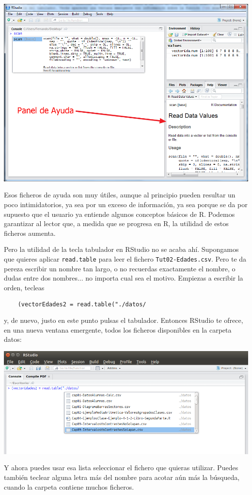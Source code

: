 \documentclass[10pt,a4paper]{article}\usepackage[]{graphicx}\usepackage[]{color}
\newcounter {cont01}
\begin{document}
    \begin{center}
    \includegraphics[width=14cm]{../fig/Tut02-09.png}
    \end{center}
Esos ficheros de ayuda son muy útiles, aunque al principio pueden resultar un poco intimidatorios, ya sea por un exceso de información, ya sea porque se da por supuesto que el usuario ya entiende algunos conceptos básicos de R. Podemos garantizar al lector que, a medida que se progresa en R, la utilidad de estos ficheros aumenta.

Pero la utilidad de la tecla tabulador en RStudio no se acaba ahí. Supongamos que quieres aplicar {\tt read.table} para leer el fichero {\tt Tut02-Edades.csv}. Pero te da pereza escribir un nombre tan largo, o no recuerdas exactamente el nombre, o dudas entre dos nombres... no importa cual sea el motivo. Empiezas a escribir la orden, tecleas 
    \begin{center}
    \begin{minipage}{10cm}
    \verb#    (vectorEdades2 = read.table("./datos/ #
    \end{minipage}
    \end{center}
y, de nuevo, justo en este punto pulsas el tabulador. Entonces RStudio te ofrece, en una nueva ventana emergente, todos los ficheros disponibles en la carpeta datos:
    \begin{center}
    \includegraphics[width=14cm]{../fig/Tut02-11b.png}
    \end{center}
Y ahora puedes usar esa lista seleccionar el fichero que quieras utilizar. Puedes también teclear alguna letra más del nombre para acotar aún más la búsqueda, cuando la carpeta contiene muchos ficheros.
\end{document}
